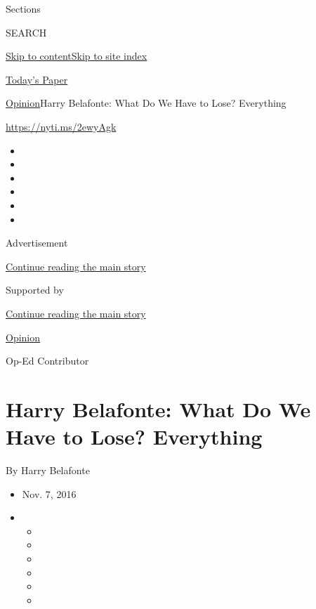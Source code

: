 Sections

SEARCH

\protect\hyperlink{site-content}{Skip to
content}\protect\hyperlink{site-index}{Skip to site index}

\href{https://myaccount.nytimes3xbfgragh.onion/auth/login?response_type=cookie\&client_id=vi}{}

\href{https://www.nytimes3xbfgragh.onion/section/todayspaper}{Today's
Paper}

\href{/section/opinion}{Opinion}\textbar{}Harry Belafonte: What Do We
Have to Lose? Everything

\url{https://nyti.ms/2ewyAgk}

\begin{itemize}
\item
\item
\item
\item
\item
\item
\end{itemize}

Advertisement

\protect\hyperlink{after-top}{Continue reading the main story}

Supported by

\protect\hyperlink{after-sponsor}{Continue reading the main story}

\href{/section/opinion}{Opinion}

Op-Ed Contributor

\hypertarget{harry-belafonte-what-do-we-have-to-lose-everything}{%
\section{Harry Belafonte: What Do We Have to Lose?
Everything}\label{harry-belafonte-what-do-we-have-to-lose-everything}}

By Harry Belafonte

\begin{itemize}
\item
  Nov. 7, 2016
\item
  \begin{itemize}
  \item
  \item
  \item
  \item
  \item
  \item
  \end{itemize}
\end{itemize}

